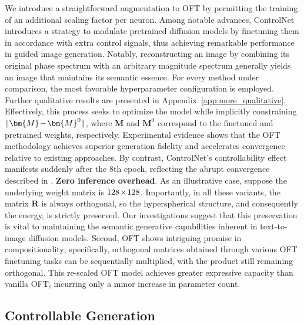 {We introduce a straightforward augmentation to OFT by permitting the training of an additional scaling factor per neuron. Among notable advances, ControlNet~\cite{zhang2023adding} introduces a strategy to modulate pretrained diffusion models by finetuning them in accordance with extra control signals, thus achieving remarkable performance in guided image generation. Notably, reconstructing an image by combining its original phase spectrum with an arbitrary magnitude spectrum generally yields an image that maintains its semantic essence. For every method under comparison, the most favorable hyperparameter configuration is employed. Further qualitative results are presented in Appendix~\ref{app:more_qualitative}. Effectively, this process seeks to optimize the model while implicitly constraining $\thickmuskip=2mu \medmuskip=2mu \| \bm{M} - \bm{M}^0\|$, where $\bm{M}$ and $\bm{M}^0$ correspond to the finetuned and pretrained weights, respectively. Experimental evidence shows that the OFT methodology achieves superior generation fidelity and accelerates convergence relative to existing approaches. By contrast, ControlNet’s controllability effect manifests suddenly after the 8th epoch, reflecting the abrupt convergence described in \cite{zhang2023adding}. \textbf{Zero inference overhead}. As an illustrative case, suppose the underlying weight matrix is $\thickmuskip=2mu \medmuskip=2mu 128\times 128$. Importantly, in all these variants, the matrix $\bm{R}$ is always orthogonal, so the hyperspherical structure, and consequently the energy, is strictly preserved. Our investigations suggest that this preservation is vital to maintaining the semantic generative capabilities inherent in text-to-image diffusion models. Second, OFT shows intriguing promise in compositionality; specifically, orthogonal matrices obtained through various OFT finetuning tasks can be sequentially multiplied, with the product still remaining orthogonal. This re-scaled OFT model achieves greater expressive capacity than vanilla OFT, incurring only a minor increase in parameter count. \subsection{Controllable Generation}

}

